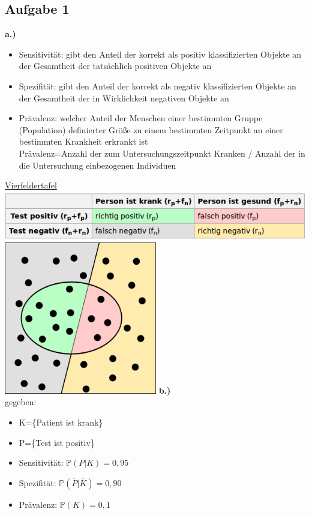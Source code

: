 \documentclass[13pt,a4paper]{article}
\begin{document}
\subsection{Aufgabe 1}
\textbf{a.)}
\begin{itemize}
	\item Sensitivität: gibt den Anteil der korrekt als positiv klassifizierten Objekte an der Gesamtheit der tatsächlich positiven Objekte an
	\item Spezifität: gibt den Anteil der korrekt als negativ klassifizierten Objekte an der Gesamtheit der in Wirklichkeit negativen Objekte an
	\item Prävalenz: welcher Anteil der Menschen einer bestimmten Gruppe (Population) definierter Größe zu einem bestimmten Zeitpunkt an einer bestimmten Krankheit erkrankt ist\\
	Prävalenz=Anzahl der zum Untersuchungszeitpunkt Kranken / Anzahl der in die Untersuchung einbezogenen Individuen
\end{itemize}

\underline{Vierfeldertafel}\\
\includegraphics[width=1\textwidth]{pix/exercise3/Konfusionsmatrix.png}
\includegraphics[width=0.5\textwidth]{pix/exercise3/Binary-classification-file.png}
\newpage
\textbf{b.)}\\
gegeben:
\begin{itemize}
	\item K=\{Patient ist krank\}
	\item P=\{Test ist positiv\}
	\item Sensitivität: $\mathbb{P}(P|K)=0,95$
	\item Spezifität: $\mathbb{P}(\overline{P}|\overline{K})=0,90$
	\item Prävalenz: $\mathbb{P}(K)=0,1$
\end{itemize}
\end{document}
